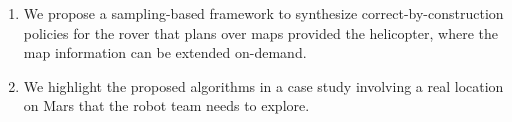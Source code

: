 \documentclass[letterpaper]{article} %
\begin{document}
\begin{enumerate}
	\item We propose a sampling-based framework to synthesize 
	correct-by-construction policies for the rover that plans over maps provided
	the helicopter, where the map information can be extended on-demand.
	
	\item We highlight the proposed algorithms in a case study involving
	a real location on Mars that the robot team needs to explore.
	
	
	
	
	
	\end{enumerate}
	
\end{document}
